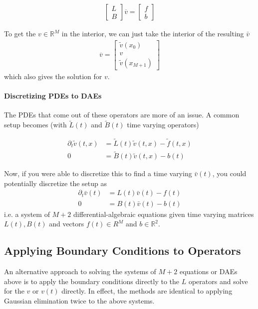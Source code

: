 \documentclass[11pt]{article}
\newcommand{\R}{\ensuremath{\mathbb{R}}}
\newcommand{\D}[1][]{\ensuremath{\partial_{#1}}}
\theoremstyle{definition}
\begin{document}
\begin{align}
\begin{bmatrix}
L \\
B
\end{bmatrix}
\overline{v} =
\begin{bmatrix}
f \\
b
\end{bmatrix}\label{eq:reflecting-barrier-extended-system}
\end{align}

To get the $v\in \R^M$ in the interior, we can just take the interior of the resulting $\bar{v}$
\begin{align}
	\overline{v} = \begin{bmatrix}
	\tilde{v}(x_0) \\
	v \\
	\tilde{v}(x_{M+1})
	\end{bmatrix}
\end{align}
which also gives the solution for $v$.

\paragraph{Discretizing PDEs to DAEs}
The PDEs that come out of these operators are more of an issue.  A common setup becomes (with $\tilde{L}(t)$ and $\tilde{B}(t)$ time varying operators)

\begin{align}
	\D[t] \tilde{v}(t,x) &= \tilde{L}(t) \tilde{v}(t,x) - \tilde{f}(t,x)  \\
	0 &= \tilde{B}(t) \tilde{v}(t,x) - b(t)
\end{align}

Now, if you were able to discretize this to find a time varying $\bar{v}(t)$, you could potentially discretize the setup as
\begin{align}
	\D[t] \bar{v}(t) &= L(t) \bar{v}(t) - f(t)\\
	0 &= B(t) \bar{v}(t) - b(t)
\end{align}
i.e. a system of $M+2$ differential-algebraic equations given time varying matrices $L(t), B(t)$ and vectors $f(t) \in R^M$ and $b \in \R^2$.


\subsection{Applying Boundary Conditions to Operators}\label{subsec:applying-bc-regular}

An alternative approach to solving the systems of $M+2$ equations or DAEs above is to apply the boundary conditions directly to the $L$ operators and solve for the $v$ or $v(t)$ directly.  In effect, the methods are identical to applying Gaussian elimination twice to the above systems.
\end{document}
